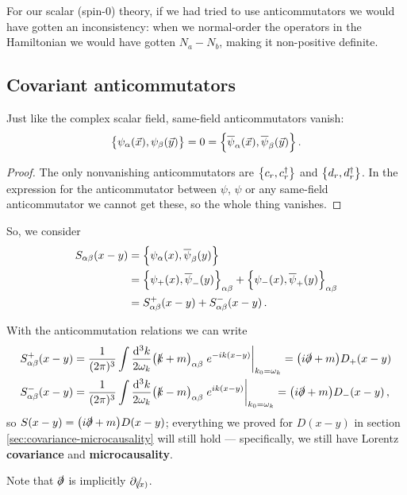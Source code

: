 \documentclass[main.tex]{subfiles}
\begin{document}
For our scalar (spin-0) theory, if we had tried to use anticommutators we would have gotten an inconsistency: when we normal-order the operators in the Hamiltonian we would have gotten \(N_a - N_b\), making it non-positive definite. 

\subsection{Covariant anticommutators}

\begin{claim}
Just like the complex scalar field, same-field anticommutators vanish: 
%
\begin{align}
\qty{\psi_{\alpha }(\vec{x}), \psi_{\beta }(\vec{y})} = 0 = \qty{\overline{\psi}_{\alpha }(\vec{x}), \overline{\psi}_{\beta }(\vec{y})}
\,.
\end{align}
\end{claim}

\begin{proof}
The only nonvanishing anticommutators are \(\qty{c_r , c_r ^\dag}\) and \(\qty{d_r, d_r ^\dag}\). In the expression for the anticommutator between \(\psi \), \(\psi \) or any same-field anticommutator we cannot get these, so the whole thing vanishes. 
\end{proof}

So, we consider 
%
\begin{align}
S_{\alpha \beta } (x-y) &= \qty{ \psi_{\alpha }(x), \overline{\psi}_{\beta }(y)}  \\
&= \qty{\psi_{+}(x), \overline{\psi}_{-}(y)}_{\alpha \beta } + 
\qty{\psi_{-}(x), \overline{\psi}_{+}(y)}_{\alpha \beta }  \\
&= S_{\alpha \beta }^{+}(x-y) + S_{\alpha \beta }^{-} (x-y)
\,.
\end{align}

With the anticommutation relations we can write 
%
\begin{align}
S^{+}_{\alpha \beta }(x-y) &= \frac{1}{(2 \pi )^3}
\int \frac{ \dd[3]{k}}{2 \omega_{k}}
\qty(\slashed{k} + m)_{\alpha \beta } \eval{e^{-ik(x-y)} }_{k_0 = \omega_{k}} = \qty(i \slashed{\partial} + m) D_+ (x-y)\\
S^{-}_{\alpha \beta }(x-y) &= \frac{1}{(2 \pi )^3}
\int \frac{ \dd[3]{k}}{2 \omega_{k}}
\qty(\slashed{k} - m)_{\alpha \beta } \eval{e^{ik(x-y)} }_{k_0 = \omega_{k}}
=\qty(i \slashed{\partial} + m) D_- (x-y)
\,,
\end{align}
%
so \(S(x-y) = \qty(i \slashed{\partial} + m )D(x-y) \); everything we proved for \(D(x-y)\) in section \ref{sec:covariance-microcausality} will still hold --- specifically, we still have Lorentz \textbf{covariance} and \textbf{microcausality}. 

Note that \(\slashed{\partial}\) is implicitly \(\slashed{\partial_{(x)}}\). 
\end{document}
